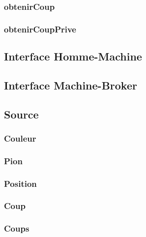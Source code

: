 \documentclass{article}
\begin{document}
\subsubsection{obtenirCoup}


\subsubsection{obtenirCoupPrive}


\subsection{Interface Homme-Machine}


\subsection{Interface Machine-Broker}


\subsection{Source}

\subsubsection{Couleur}


\subsubsection{Pion}


\subsubsection{Position}


\subsubsection{Coup}


\subsubsection{Coups}

\end{document}

